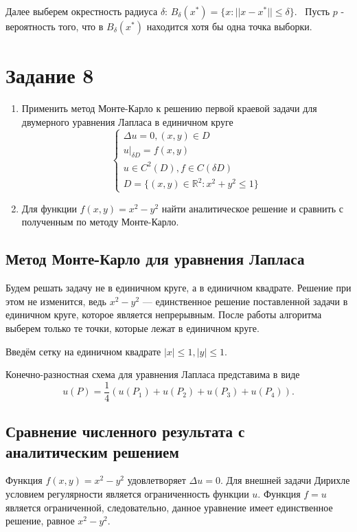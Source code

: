 \documentclass[11pt]{report}
\begin{document}
Далее выберем окрестность радиуса $\delta$: $B_\delta(x^*)=\{ x: ||x-x^*||\leqslant \delta \}$. \
Пусть $p$ - вероятность того, что в $B_\delta(x^*)$ находится хотя бы одна точка выборки.


\section{Задание 8}

\begin{enumerate}

\item Применить метод Монте-Карло к решению первой краевой задачи для двумерного уравнения Лапласа в единичном круге
$$
\begin{cases}
\Delta u = 0,(x,y)\in D \\
u\vert_{\delta D} = f(x,y) \\
u\in C^2(D), f\in C(\delta D) \\
D=\{(x,y)\in\mathbb{R}^2: x^2+y^2\leqslant 1 \}
\end{cases}
$$

\item Для функции $f(x,y) = x^2-y^2$ найти аналитическое решение и сравнить с полученным по методу Монте-Карло.

\end{enumerate}

\subsection{Метод Монте-Карло для уравнения Лапласа}

Будем решать задачу не в единичном круге, а в единичном квадрате. Решение при этом не изменится, ведь $x^2-y^2$ --- единственное решение поставленной задачи в единичном круге, которое является непрерывным. После работы алгоритма выберем только те точки, которые лежат в единичном круге.

Введём сетку на единичном квадрате $|x|\leqslant1, |y|\leqslant1$.

Конечно-разностная схема для уравнения Лапласа представима в виде
$$
u(P) = \dfrac{1}{4}\left( u(P_1) + u(P_2) + u(P_3) + u(P_4) \right).
$$

\subsection{Сравнение численного результата с аналитическим решением}

Функция $f(x,y)=x^2-y^2$ удовлетворяет $\Delta u=0$. Для внешней задачи Дирихле условием регулярности является ограниченность функции $u$. Функция $f=u$ является ограниченной, следовательно, данное уравнение имеет единственное решение, равное $x^2-y^2$.
\end{document}
